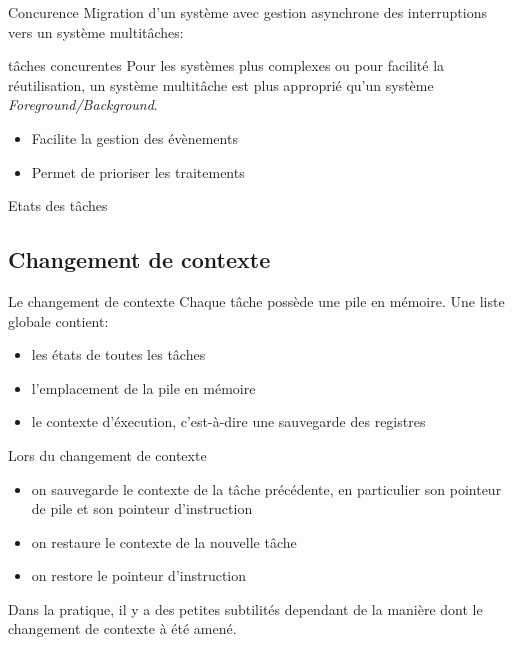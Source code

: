 \begin{frame}{Concurence}
  Migration d'un système avec gestion asynchrone des interruptions vers
  un système multitâches:
  \begin{center}
  \end{center}
\end{frame} 

\begin{frame}{tâches concurentes}
  Pour les  systèmes plus complexes ou pour  facilité la réutilisation,
  un   système   multitâche   est   plus   approprié   qu'un   système
  \emph{Foreground/Background}.
  \begin{itemize} 
  \item Facilite la gestion des évènements
  \item Permet de prioriser les traitements
  \end{itemize} 
\end{frame} 

\begin{frame}{Etats des tâches}
  \begin{center}
    
  \end{center}
\end{frame} 


\subsection{Changement de contexte}

\begin{frame}{Le changement de contexte}
  Chaque tâche possède une pile en mémoire. Une liste globale contient:
  \begin{itemize} 
  \item les états de toutes les tâches
  \item l'emplacement de la pile en mémoire
  \item le contexte d'éxecution, c'est-à-dire une sauvegarde des registres
  \end{itemize} 
  Lors du changement de contexte
  \begin{itemize} 
  \item  on  sauvegarde  le   contexte  de  la  tâche  précédente,  en
    particulier son pointeur de pile et son pointeur d'instruction
  \item on restaure le contexte de la nouvelle tâche
  \item on restore le pointeur d'instruction
  \end{itemize} 
  Dans  la pratique, il  y a  des petites  subtilités dependant  de la
  manière dont le changement de contexte à été amené.
\end{frame} 

